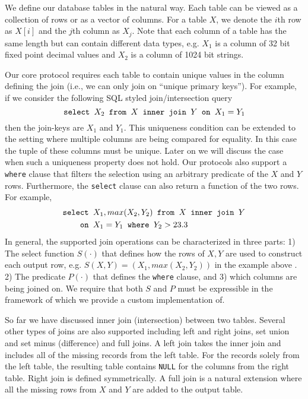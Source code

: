 \documentclass[11pt,letterpaper]{article}
\providecommand{\DIFaddbegin}{} %
\providecommand{\DIFaddend}{} %
\begin{document}
We define our database tables in the natural way. Each table can be viewed as a collection of rows or as a vector of columns. For a table $X$, we denote the $i$th row as $X[i]$ and the $j$th column as $X_j$. 
\iffullversion
Note that each column of a table has the same length but can contain different data types, e.g. $X_1$ is a column of 32 bit fixed point decimal values and $X_2$ is a column of 1024 bit strings.

\fi
Our core protocol requires each table to contain unique values in the column defining the join  (i.e., we can only join on ``unique primary keys''). For example, if we consider the following SQL styled join/intersection query
\DIFaddbegin \vspace{-0.1cm}
\DIFaddend $$
\texttt{select } X_2 \texttt{ from } X \texttt{ inner join } Y \texttt{ on } X_1 = Y_1
\DIFaddbegin \vspace{-0.1cm}
\DIFaddend $$
then the join-keys are $X_1$ and $Y_1$. This uniqueness condition can be extended to the setting where multiple columns are being compared for equality. 
\iffullversion
In this case the tuple of these columns must be unique. 
\fi
Later on we will discuss the case when such a uniqueness property does not hold. Our protocols also support a \texttt{where} clause that filters the selection using an arbitrary predicate of the $X$ and $Y$ rows. Furthermore, the \texttt{select} clause can also return a function of the two rows. For example,
\DIFaddbegin \vspace{-0.1cm}
\DIFaddend \begin{align*}
\texttt{select }&  X_1,max(X_2, Y_2)  \texttt{ from } X \texttt{ inner join } Y \\
\texttt{on }& X_1 = Y_1 \texttt{ where } Y_2 > 23.3
\DIFaddbegin \vspace{-0.1cm}
\DIFaddend \end{align*}
In general, the supported join operations can be characterized in three parts: 1) The select function $S(\cdot)$ that defines how the rows of $X,Y$ are used to construct each output row, e.g. $S(X,Y)=(X_1, max(X_2,Y_2))$
\iffullversion
in the example above
\fi. 2) The predicate $P(\cdot)$ that defines the \texttt{where} clause, and 3) which columns are being joined on.
\iffullversion
 We require that both $S$ and $P$ must be expressible in the framework of \cite{aby3} which we provide a custom implementation of.
\fi

\iffullversion
So far we have discussed inner join (intersection) between two tables. 
\fi
Several other types of joins are also supported including left and right joins, set union and set minus (difference) and full joins. A left join takes the inner join and includes all of the missing records from the left table. For the records solely from the left table, the resulting table contains \texttt{NULL} for the columns from the right table. Right join is defined symmetrically. A full join is a natural extension where all the missing rows from $X$ and $Y$ are added to the output table.
\end{document}
